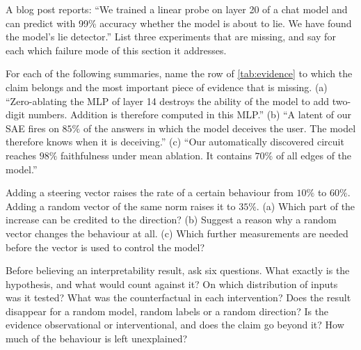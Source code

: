 \begin{exercise}\label{ex:critique}
A blog post reports: ``We trained a linear probe on layer 20 of a chat model and can predict with 99\% accuracy
whether the model is about to lie. We have found the model's lie detector.'' List three experiments that are
missing, and say for each which failure mode of this section it addresses.
\end{exercise}

\begin{exercise}\label{ex:abstracts}
For each of the following summaries, name the row of \cref{tab:evidence} to which the claim belongs and the most
important piece of evidence that is missing. (a) ``Zero-ablating the MLP of layer 14 destroys the ability of the
model to add two-digit numbers. Addition is therefore computed in this MLP.'' (b) ``A latent of our SAE fires on
$85\%$ of the answers in which the model deceives the user. The model therefore knows when it is deceiving.''
(c) ``Our automatically discovered circuit reaches $98\%$ faithfulness under mean ablation. It contains $70\%$ of
all edges of the model.''
\end{exercise}

\begin{exercise}\label{ex:steerbaseline}
Adding a steering vector raises the rate of a certain behaviour from $10\%$ to $60\%$. Adding a random vector of
the same norm raises it to $35\%$. (a) Which part of the increase can be credited to the direction? (b) Suggest a
reason why a random vector changes the behaviour at all. (c) Which further measurements are needed before the
vector is used to control the model?
\end{exercise}

\begin{takeaways}
Before believing an interpretability result, ask six questions. What exactly is the hypothesis, and what would
count against it? On which distribution of inputs was it tested? What was the counterfactual in each
intervention? Does the result disappear for a random model, random labels or a random direction? Is the
evidence observational or interventional, and does the claim go beyond it? How much of the behaviour is left
unexplained?
\end{takeaways}

